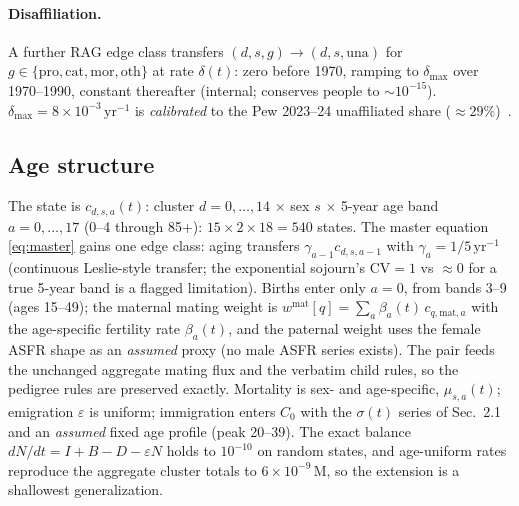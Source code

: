 \documentclass[11pt,a4paper]{article}
\begin{document}
\paragraph{Disaffiliation.}  A further RAG edge class transfers
$(d,s,g)\to(d,s,\mathrm{una})$ for
$g\in\{\mathrm{pro},\mathrm{cat},\mathrm{mor},\mathrm{oth}\}$ at rate
$\delta(t)$: zero before 1970, ramping to $\delta_{\max}$ over
1970--1990, constant thereafter (internal; conserves people to
$\sim 10^{-15}$).  $\delta_{\max}=8\times10^{-3}\,\mathrm{yr}^{-1}$ is
\emph{calibrated} to the Pew 2023--24 unaffiliated share ($\approx
29\%$)~\cite{pew-rls-2025}.

\subsection{Age structure}
\label{sec:age}
The state is $c_{d,s,a}(t)$: cluster $d=0,\dots,14$ $\times$ sex $s$ $\times$
5-year age band $a=0,\dots,17$ (0--4 through 85+): $15\times2\times18=540$
states.  The master equation \eqref{eq:master} gains one edge class: aging
transfers $\gamma_{a-1}c_{d,s,a-1}$ with $\gamma_a=1/5\,\mathrm{yr}^{-1}$
(continuous Leslie-style transfer; the exponential sojourn's CV${}=1$
vs $\approx 0$ for a true 5-year band is a flagged limitation).  Births
enter only $a=0$, from bands 3--9 (ages 15--49); the maternal mating weight
is $w^{\mathrm{mat}}[q]=\sum_a\beta_a(t)\,c_{q,\mathrm{mat},a}$ with the
age-specific fertility rate $\beta_a(t)$, and the paternal weight uses the
female ASFR shape as an \emph{assumed} proxy (no male ASFR series exists).
The pair feeds the unchanged aggregate mating flux and the verbatim child
rules, so the pedigree rules are preserved exactly.  Mortality is
sex- and age-specific, $\mu_{s,a}(t)$; emigration $\varepsilon$ is uniform;
immigration enters $C_0$ with the $\sigma(t)$ series of
Sec.~2.1 and an \emph{assumed} fixed age profile (peak
20--39).  The exact balance
$dN/dt=I+B-D-\varepsilon N$ holds to $10^{-10}$ on random states, and
age-uniform rates reproduce the aggregate cluster totals to
$6\times10^{-9}$\,M, so the extension is a shallowest generalization.
\end{document}
